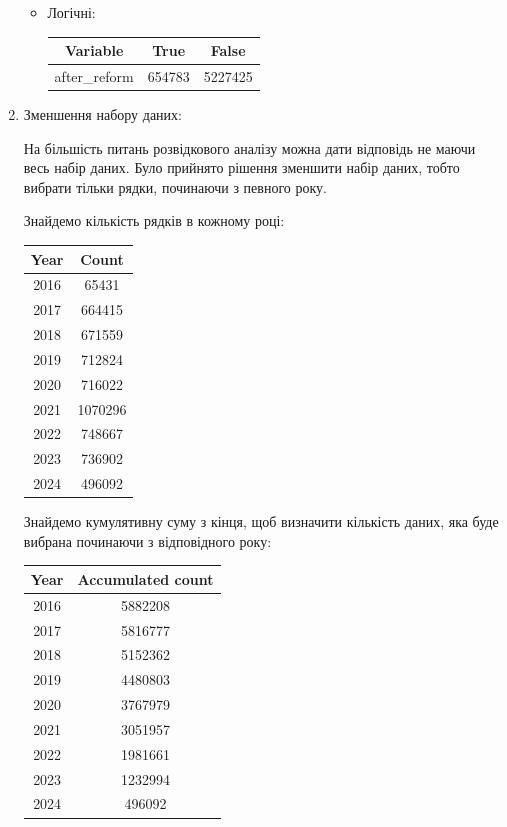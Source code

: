 \documentclass[./report.tex]{subfiles}
\begin{document}
\begin{enumerate}
\begin{itemize}
     \item Логічні:
     
    \begin{tabular}{ccc}
        \hline
        \textbf{Variable} & \textbf{True} & \textbf{False} \\
        \hline
        after\_reform     &  654783       &  5227425       \\               
    \end{tabular}    
    
    \end{itemize}
    
    \pagebreak

    \item Зменшення набору даних:

    На більшість питань розвідкового аналізу можна дати відповідь не маючи весь набір
    даних. Було прийнято рішення зменшити набір даних, тобто вибрати тільки рядки, 
    починаючи з певного року.

    Знайдемо кількість рядків в кожному році:

    \begin{tabular}{cc}
        \hline
        \textbf{Year} & \textbf{Count} \\
        \hline
        2016          & 65431          \\
        2017          & 664415         \\
        2018          & 671559         \\
        2019          & 712824         \\
        2020          & 716022         \\
        2021          & 1070296        \\
        2022          & 748667         \\
        2023          & 736902         \\
        2024          & 496092         \\
    \end{tabular}

    Знайдемо кумулятивну суму з кінця, щоб визначити кількість даних, яка буде вибрана 
    починаючи з відповідного року:

    \begin{tabular}{cc}
        \hline
        \textbf{Year} & \textbf{Accumulated count} \\
        \hline
        2016 & 5882208 \\
        2017 & 5816777 \\
        2018 & 5152362 \\
        2019 & 4480803 \\
        2020 & 3767979 \\
        2021 & 3051957 \\
        2022 & 1981661 \\
        2023 & 1232994 \\
        2024 & 496092  \\
    \end{tabular}


\end{enumerate}
\end{document}
